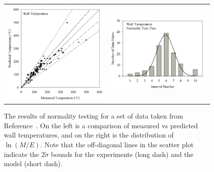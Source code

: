 \documentclass[fleqn,b5paper]{article}
\begin{document}
\begin{figure}[ht!]
\begin{tabular}{ll}
\includegraphics[width=2.8in]{../FDS_Validation_Guide/FIGURES/Wall_Temperature_Scatter} &
\includegraphics[width=2.8in]{../FDS_Validation_Guide/FIGURES/Wall_Temperature_Normality}
\end{tabular}
\caption[Testing the normality of validation data.]{The results of normality testing for a set of data taken from Reference~\cite{NUREG_1824}. On the
left is a comparison of measured vs predicted wall temperatures, and on the right is the distribution of $\ln(M/E)$. Note that the off-diagonal lines in the scatter plot
indicate the $2 \widetilde{\sigma}$ bounds for the experiments (long dash) and the model (short dash).}
\label{Normality}
\end{figure}
\end{document}
